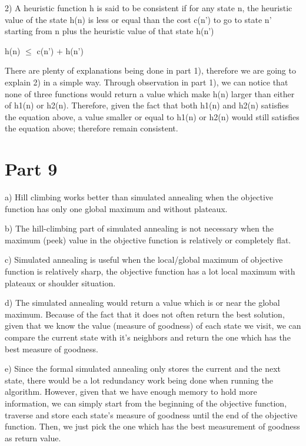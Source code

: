 \documentclass{article}
\begin{document}
\vspace{5mm}

2) A heuristic function h is said to be consistent if for any state n, the heuristic value of the state h{\small(n)} is less or equal than the cost c{\small(n')} to go to state n' starting from n plus the heuristic value of that state h{\small(n')}

\begin{center}

h{\small(n)} $\le$ c{\small(n')} + h{\small(n')}

\end{center}

There are plenty of explanations being done in part 1), therefore we are going to explain 2) in a simple way. Through observation in part 1), we can notice that none of three functions would return a value which make h{\small(n)} larger than either of h{\small1(n)} or h{\small2(n)}. Therefore, given the fact that both h{\small 1(n)} and h{\small 2(n)} satisfies the equation above, a value smaller or equal to h{\small 1(n)} or h{\small 2(n)} would still satisfies the equation above; therefore remain consistent.

\section*{Part 9}

\hspace{5mm} 

a) Hill climbing works better than simulated annealing when the objective function has only one global maximum and without plateaux.

b) The hill-climbing part of simulated annealing is not necessary when the maximum (peek) value in the objective function is relatively or completely flat.

c) Simulated annealing is useful when the local/global maximum of objective function is relatively sharp, the objective function has a lot local maximum with plateaux or shoulder situation.

d) The simulated annealing would return a value which is or near the global maximum. Because of the fact that it does not often return the best solution, given that we know the value (measure of goodness) of each state we visit, we can compare the current state with it's neighbors and return the one which has the best measure of goodness.

e) Since the formal simulated annealing only stores the current and the next state, there would be a lot redundancy work being done when running the algorithm. However, given that we have enough memory to hold more information, we can simply start from the beginning of the objective function, traverse and store each state's measure of goodness until the end of the objective function. Then, we just pick the one which has the best measurement of goodness as return value.
\end{document}
